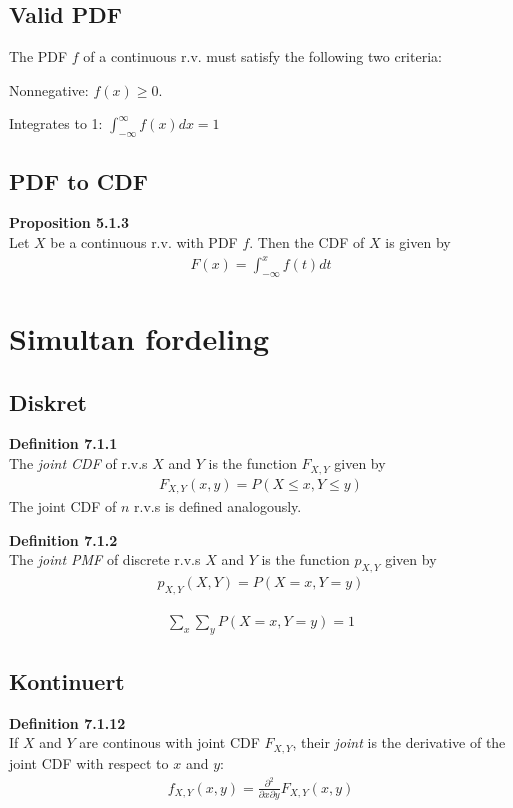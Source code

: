 \documentclass{article}
\begin{document}
\subsection*{Valid PDF}
The PDF $f$ of a continuous r.v. must satisfy the following two criteria:
\begin{itemize*}
  \item Nonnegative: $f(x) \geq 0$.
  \item Integrates to 1: $\int_{-\infty}^{\infty}{f(x)}dx = 1$
\end{itemize*}
\subsection*{PDF to CDF}
\textbf{Proposition 5.1.3}\\
Let $X$ be a continuous r.v. with PDF $f$. Then the CDF of $X$ is given by
\begin{align*}
  F(x) = \int_{-\infty}^{x}{f(t)}dt
\end{align*}

\section*{Simultan fordeling}
\subsection*{Diskret}
\textbf{Definition 7.1.1}\\
The \textit{joint CDF}  of r.v.s $X$ and $Y$ is the function $F_{X,Y}$ given by
\begin{align*}
  F_{X,Y}(x,y) = P(X \leq x, Y \leq y)
\end{align*}
The joint CDF of $n$ r.v.s is defined analogously.

\textbf{Definition 7.1.2}\\
The \textit{joint PMF} of discrete r.v.s $X$ and $Y$ is the function $p_{X,Y}$ given by
\begin{align*}
  p_{X,Y}(X,Y) = P(X = x, Y = y)
\end{align*}

\begin{align*}
  \sum_x \sum_y P(X = x, Y = y) = 1
\end{align*}
\subsection*{Kontinuert}
\textbf{Definition 7.1.12}\\
If $X$ and $Y$ are continous with joint CDF $F_{X,Y}$, their \textit{joint} is the derivative of the joint CDF with respect to $x$ and $y$:
\begin{align*}
  f_{X,Y}(x,y) = \frac{\partial^2}{\partial{x} \partial{y}}F_{X,Y}(x,y)
\end{align*}
\end{document}
